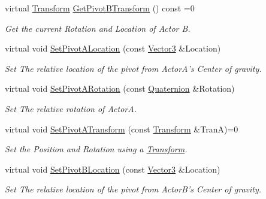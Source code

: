 \begin{DoxyCompactItemize}
virtual \hyperlink{classMezzanine_1_1Transform}{Transform} \hyperlink{classMezzanine_1_1DualTransformConstraint_a43e5f5d4cfd9b0ab7032d81df5c935d7}{GetPivotBTransform} () const =0
\begin{DoxyCompactList}\small\item\em Get the current Rotation and Location of Actor B. \item\end{DoxyCompactList}\item 
virtual void \hyperlink{classMezzanine_1_1DualTransformConstraint_a3dc5e7afcf612a481f81071201ecdeb7}{SetPivotALocation} (const \hyperlink{classMezzanine_1_1Vector3}{Vector3} \&Location)
\begin{DoxyCompactList}\small\item\em Set The relative location of the pivot from ActorA's Center of gravity. \item\end{DoxyCompactList}\item 
virtual void \hyperlink{classMezzanine_1_1DualTransformConstraint_a73cba60ff65f8ac2775b19f74e5cbe9e}{SetPivotARotation} (const \hyperlink{classMezzanine_1_1Quaternion}{Quaternion} \&Rotation)
\begin{DoxyCompactList}\small\item\em Set The relative rotation of ActorA. \item\end{DoxyCompactList}\item 
virtual void \hyperlink{classMezzanine_1_1DualTransformConstraint_a6f1713e6af9d89de70ff77ed47c82d31}{SetPivotATransform} (const \hyperlink{classMezzanine_1_1Transform}{Transform} \&TranA)=0
\begin{DoxyCompactList}\small\item\em Set the Position and Rotation using a \hyperlink{classMezzanine_1_1Transform}{Transform}. \item\end{DoxyCompactList}\item 
virtual void \hyperlink{classMezzanine_1_1DualTransformConstraint_abf63fe4c4fc3c57a0eed7ed006a00aee}{SetPivotBLocation} (const \hyperlink{classMezzanine_1_1Vector3}{Vector3} \&Location)
\begin{DoxyCompactList}\small\item\em Set The relative location of the pivot from ActorB's Center of gravity. \item\end{DoxyCompactList}\item 

\end{DoxyCompactItemize}
